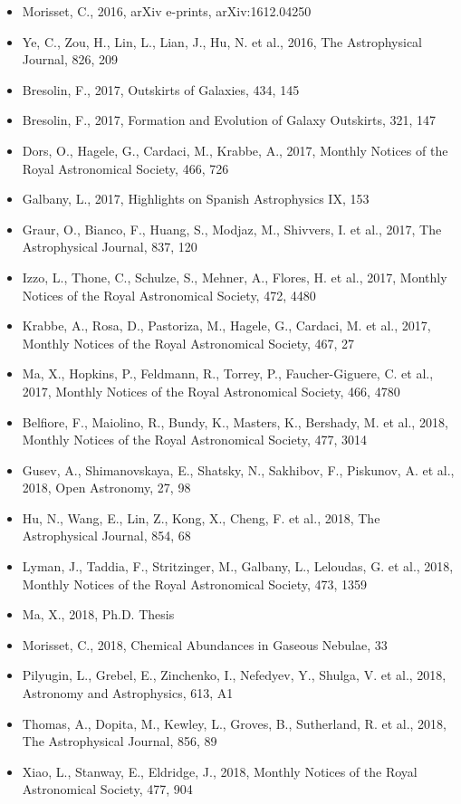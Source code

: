 \documentclass{letter}
\begin{document}
\begin{enumerate}
\begin{itemize}
\item Morisset, C., 2016, arXiv e-prints, arXiv:1612.04250
\item Ye, C., Zou, H., Lin, L., Lian, J., Hu, N. et al., 2016, The Astrophysical Journal, 826, 209
\item Bresolin, F., 2017, Outskirts of Galaxies, 434, 145
\item Bresolin, F., 2017, Formation and Evolution of Galaxy Outskirts, 321, 147
\item Dors, O., Hagele, G., Cardaci, M., Krabbe, A., 2017, Monthly Notices of the Royal Astronomical Society, 466, 726
\item Galbany, L., 2017, Highlights on Spanish Astrophysics IX, 153
\item Graur, O., Bianco, F., Huang, S., Modjaz, M., Shivvers, I. et al., 2017, The Astrophysical Journal, 837, 120
\item Izzo, L., Thone, C., Schulze, S., Mehner, A., Flores, H. et al., 2017, Monthly Notices of the Royal Astronomical Society, 472, 4480
\item Krabbe, A., Rosa, D., Pastoriza, M., Hagele, G., Cardaci, M. et al., 2017, Monthly Notices of the Royal Astronomical Society, 467, 27
\item Ma, X., Hopkins, P., Feldmann, R., Torrey, P., Faucher-Giguere, C. et al., 2017, Monthly Notices of the Royal Astronomical Society, 466, 4780
\item Belfiore, F., Maiolino, R., Bundy, K., Masters, K., Bershady, M. et al., 2018, Monthly Notices of the Royal Astronomical Society, 477, 3014
\item Gusev, A., Shimanovskaya, E., Shatsky, N., Sakhibov, F., Piskunov, A. et al., 2018, Open Astronomy, 27, 98
\item Hu, N., Wang, E., Lin, Z., Kong, X., Cheng, F. et al., 2018, The Astrophysical Journal, 854, 68
\item Lyman, J., Taddia, F., Stritzinger, M., Galbany, L., Leloudas, G. et al., 2018, Monthly Notices of the Royal Astronomical Society, 473, 1359
\item Ma, X., 2018, Ph.D. Thesis
\item Morisset, C., 2018, Chemical Abundances in Gaseous Nebulae, 33
\item Pilyugin, L., Grebel, E., Zinchenko, I., Nefedyev, Y., Shulga, V. et al., 2018, Astronomy and Astrophysics, 613, A1
\item Thomas, A., Dopita, M., Kewley, L., Groves, B., Sutherland, R. et al., 2018, The Astrophysical Journal, 856, 89
\item Xiao, L., Stanway, E., Eldridge, J., 2018, Monthly Notices of the Royal Astronomical Society, 477, 904

\end{itemize}
\end{enumerate}
\end{document}

